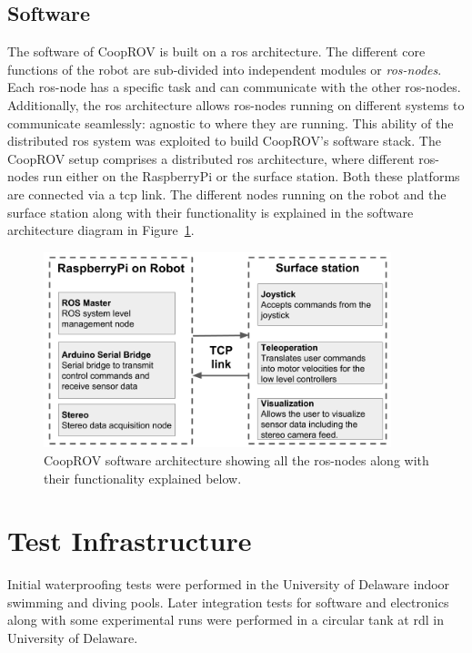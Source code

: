 \documentclass {udthesis}
\begin{document}
\subsection{Software}

The software of CoopROV is built on a \gls{ros} architecture. The different core functions of the robot are sub-divided into independent modules or \emph{\gls{ros}-nodes}. Each \gls{ros}-node has a specific task and can communicate with the other \gls{ros}-nodes. Additionally, the \gls{ros} architecture allows \gls{ros}-nodes running on different systems to communicate seamlessly: agnostic to where they are running. This ability of the distributed \gls{ros} system was exploited to build CoopROV's software stack. The CoopROV setup comprises a distributed \gls{ros} architecture, where different \gls{ros}-nodes run either on the RaspberryPi or the surface station. Both these platforms are connected via a \gls{tcp} link. The different nodes running on the robot and the surface station along with their functionality is explained in the software architecture diagram in Figure~\ref{fig:cooprov_software}.
%
\begin{figure}
  \centering
  \includegraphics[width=0.9\textwidth]{cooprov_software}
  \caption[CoopROV software architecture]{CoopROV software architecture showing all the \gls{ros}-nodes along with their functionality explained below.}
  \label{fig:cooprov_software}
\end{figure} 


\section{Test Infrastructure}

Initial waterproofing tests were performed in the University of Delaware indoor swimming and diving pools. Later integration tests for software and electronics along with some experimental runs were performed in a circular tank at \gls{rdl} in University of Delaware.
\end{document}
